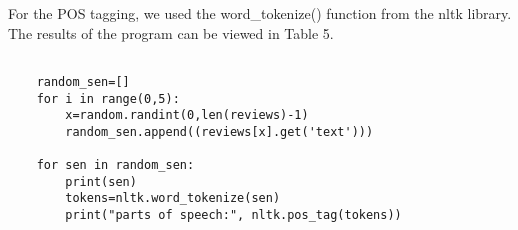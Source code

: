 For the POS tagging, we used the word\_tokenize() function from the nltk library.
The results of the program can be viewed in Table 5.\\
\begin{Verbatim}[fontsize=\tiny]

    random_sen=[]
    for i in range(0,5):
        x=random.randint(0,len(reviews)-1)
        random_sen.append((reviews[x].get('text')))

    for sen in random_sen:
        print(sen)
        tokens=nltk.word_tokenize(sen)
        print("parts of speech:", nltk.pos_tag(tokens))

\end{Verbatim}


